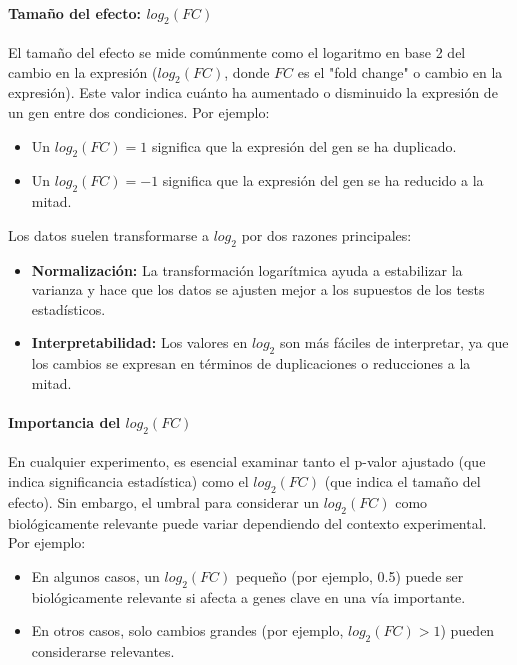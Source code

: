\paragraph{Tamaño del efecto: $log_2(FC)$} El tamaño del efecto se mide comúnmente como el logaritmo en base 2 del cambio en la expresión ($log_2(FC)$, donde $FC$ es el "fold change" o cambio en la expresión). Este valor indica cuánto ha aumentado o disminuido la expresión de un gen entre dos condiciones. Por ejemplo:
\begin{itemize}
\item Un $log_2(FC) = 1$ significa que la expresión del gen se ha duplicado.
\item Un $log_2(FC) = - 1$ significa que la expresión del gen se ha reducido a la mitad.
\end{itemize}

Los datos suelen transformarse a $log_2$ por dos razones principales:
\begin{itemize}
\item \textbf{Normalización:} La transformación logarítmica ayuda a estabilizar la varianza y hace que los datos se ajusten mejor a los supuestos de los tests estadísticos.
\item \textbf{Interpretabilidad:} Los valores en $log_2$ son más fáciles de interpretar, ya que los cambios se expresan en términos de duplicaciones o reducciones a la mitad.
\end{itemize}

\paragraph{Importancia del $log_2(FC)$} En cualquier experimento, es esencial examinar tanto el p-valor ajustado (que indica significancia estadística) como el $log_2(FC)$ (que indica el tamaño del efecto). Sin embargo, el umbral para considerar un $log_2(FC)$ como biológicamente relevante puede variar dependiendo del contexto experimental. Por ejemplo:
\begin{itemize}
\item En algunos casos, un $log_2(FC)$ pequeño (por ejemplo, 0.5) puede ser biológicamente relevante si afecta a genes clave en una vía importante.
\item En otros casos, solo cambios grandes (por ejemplo, $log_2(FC) > 1$) pueden considerarse relevantes.
\end{itemize}

